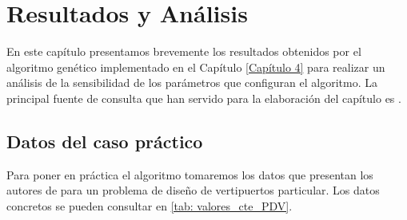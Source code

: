 \documentclass[12pt,a4paper]{book}
\begin{document}
 
%

\chapter{Resultados y Análisis} \label{Capítulo 5}
En este capítulo presentamos brevemente los resultados obtenidos por el algoritmo genético implementado en el Capítulo \ref{Capítulo 4} para realizar un análisis de la sensibilidad de los parámetros que configuran el algoritmo. La principal fuente de consulta que han servido para la elaboración del capítulo es \cite{ugarte2008probability}.
   
\section{Datos del caso práctico} \label{Subsec: 5_1}
Para poner en práctica el algoritmo tomaremos los datos que presentan los autores de \cite{park_vertiport_2022} para un problema de diseño de vertipuertos particular. Los datos concretos se pueden consultar en \ref{tab: valores_cte_PDV}.
\end{document}
